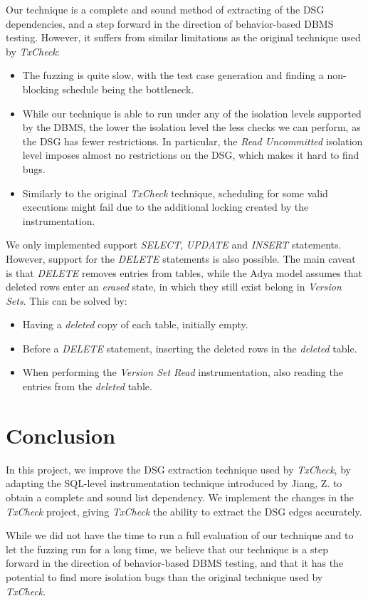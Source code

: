 Our technique is a complete and sound method of extracting of the DSG dependencies, and a step forward in the direction of behavior-based DBMS testing. However, it suffers from similar limitations as the original technique used by \textit{TxCheck}:
\begin{itemize}
    \item The fuzzing is quite slow, with the test case generation and finding a non-blocking schedule being the bottleneck.
    \item While our technique is able to run under any of the isolation levels supported by the DBMS, the lower the isolation level the less checks we can perform, as the DSG has fewer restrictions. In particular, the \textit{Read Uncommitted} isolation level imposes almost no restrictions on the DSG, which makes it hard to find bugs.
    \item Similarly to the original \textit{TxCheck} technique, scheduling for some valid executions might fail due to the additional locking created by the instrumentation.
\end{itemize}

We only implemented support \textit{SELECT}, \textit{UPDATE} and \textit{INSERT} statements. However, support for the \textit{DELETE} statements is also possible. The main caveat is that \textit{DELETE} removes entries from tables, while the Adya model assumes that deleted rows enter an \textit{erased} state, in which they still exist belong in \textit{Version Sets}. This can be solved by:
\begin{itemize}
    \item Having a \textit{deleted} copy of each table, initially empty.
    \item Before a \textit{DELETE} statement, inserting the deleted rows in the \textit{deleted} table.
    \item When performing the \textit{Version Set Read} instrumentation, also reading the entries from the \textit{deleted} table.
\end{itemize}

\section{Conclusion}

In this project, we improve the DSG extraction technique used by \textit{TxCheck}, by adapting the SQL-level instrumentation technique introduced by Jiang, Z. \cite{jiang2023detecting} to obtain a complete and sound list dependency. We implement the changes in the \textit{TxCheck} project, giving \textit{TxCheck} the ability to extract the DSG edges accurately.

While we did not have the time to run a full evaluation of our technique and to let the fuzzing run for a long time, we believe that our technique is a step forward in the direction of behavior-based DBMS testing, and that it has the potential to find more isolation bugs than the original technique used by \textit{TxCheck}.